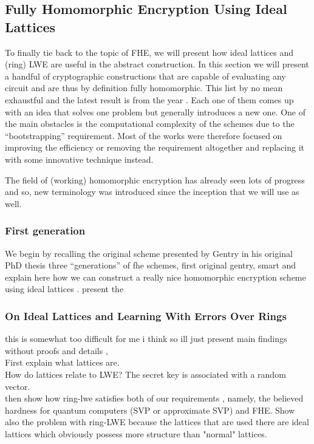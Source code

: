 


\subsection{Fully Homomorphic Encryption Using Ideal Lattices}
To finally tie back to the topic of FHE, we will present how ideal lattices and (ring) LWE are useful in the abstract construction. In this section we will present a handful of cryptographic constructions that are capable of evaluating any circuit and are thus by definition fully homomorphic. This list by no mean exhaustful and the latest result is from the year . Each one of them comes up with an idea that solves one problem but generally introduces a new one. One of the main obstacles is the computational complexity of the schemes due to the ``bootstrapping'' requirement. Most of the works were therefore focused on improving the efficiency or removing the requirement altogether and replacing it with some innovative technique instead.

The field of (working) homomorphic encryption has already seen lots of progress and so, new terminology was introduced since the inception that we will use as well.

\subsubsection{First generation}
We begin by recalling the original scheme presented by Gentry in his original PhD thesis
three ``generations'' of fhe schemes, first original gentry, smart and
explain here how we can construct a really nice homomorphic encryption scheme using ideal lattices \cite{gentry}. present the 
\subsubsection*{On Ideal Lattices and Learning With Errors Over Rings}
this is somewhat too difficult for me i think so ill just present main findings without proofs and details \cite{regev}, \\
First explain what lattices are. \\
How do lattices relate to LWE? The secret key is associated with a random vector. \\
then show how ring-lwe satisfies both of our requirements \cite{ring-lwe}, namely, the believed hardness for quantum computers (SVP or approximate SVP) and FHE. Show also the problem with ring-LWE because the lattices that are used there are ideal lattices which obviously possess more structure than "normal" lattices.
